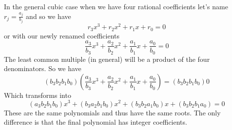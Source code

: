 \documentclass[10 pt]{amsart}
\theoremstyle{definition}
\theoremstyle{remark}
\numberwithin{equation}{subsection}
\begin{document}
In the general cubic case when we have four rational coefficients let's name $r_j = \frac{a_j}{b_j}$ and so we have
\[
r_3x^3 + r_2x^2 + r_1x + r_0 =0
\]
or with our newly renamed coefficients
\[
\frac{a_3}{b_3}x^3 + \frac{a_2}{b_2}x^2 + \frac{a_1}{b_1}x + \frac{a_0}{b_0} = 0
\]
The least common multiple (in general) will be a product of the four denominators.  So we have
\[
(b_3b_2b_1b_0)\left(\frac{a_3}{b_3}x^3 + \frac{a_2}{b_2}x^2 + \frac{a_1}{b_1}x + \frac{a_0}{b_0}\right) =(b_3b_2b_1b_0) 0
\]
Which transforms into
\[
(a_3b_2b_1b_0)x^3 + (b_3a_2b_1b_0)x^2 + (b_3b_2a_1b_0)x + (b_3b_2b_1a_0) = 0
\]
These are the same polynomials and thus have the same roots.  The only difference is that the final polynomial has integer coefficients.
\end{document}
